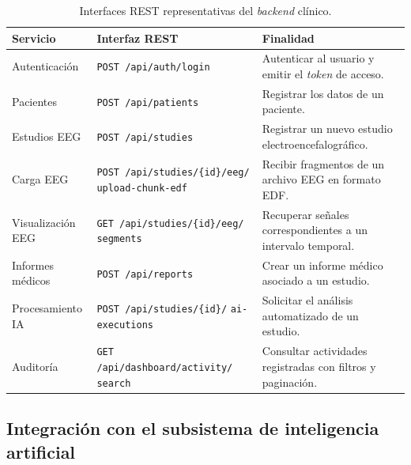 \begin{table}[H]
\centering
\caption{Interfaces REST representativas del \textit{backend} clínico.}
\label{tab:interfaces-rest-backend}

\small
\setlength{\tabcolsep}{4pt}
\renewcommand{\arraystretch}{1.3}

\begin{tabular}{|p{2.4cm}|p{6.2cm}|p{4.4cm}|}
\hline
\textbf{Servicio} &
\textbf{Interfaz REST} &
\textbf{Finalidad} \\ \hline

Autenticación &
\texttt{POST /api/auth/login} &
Autenticar al usuario y emitir el \textit{token} de acceso. \\ \hline

Pacientes &
\texttt{POST /api/patients} &
Registrar los datos de un paciente. \\ \hline

Estudios EEG &
\texttt{POST /api/studies} &
Registrar un nuevo estudio electroencefalográfico. \\ \hline

Carga EEG &
\texttt{POST /api/studies/\{id\}/eeg/}
\newline
\texttt{upload-chunk-edf} &
Recibir fragmentos de un archivo EEG en formato EDF. \\ \hline

Visualización EEG &
\texttt{GET /api/studies/\{id\}/eeg/}
\newline
\texttt{segments} &
Recuperar señales correspondientes a un intervalo temporal. \\ \hline

Informes médicos &
\texttt{POST /api/reports} &
Crear un informe médico asociado a un estudio. \\ \hline

Procesamiento IA &
\texttt{POST /api/studies/\{id\}/}
\newline
\texttt{ai-executions} &
Solicitar el análisis automatizado de un estudio. \\ \hline

Auditoría &
\texttt{GET /api/dashboard/activity/}
\newline
\texttt{search} &
Consultar actividades registradas con filtros y paginación. \\ \hline

\end{tabular}
\end{table}


\subsection{Integración con el subsistema de inteligencia artificial}
\label{subsec:integracion-subsistema-ia}

